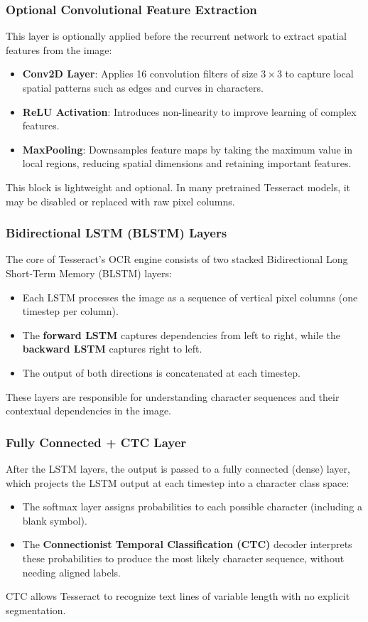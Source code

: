 \subsubsection*{Optional Convolutional Feature Extraction}
This layer is optionally applied before the recurrent network to extract spatial features from the image:
\begin{itemize}
    \item \textbf{Conv2D Layer}: Applies 16 convolution filters of size $3 \times 3$ to capture local spatial patterns such as edges and curves in characters.
    \item \textbf{ReLU Activation}: Introduces non-linearity to improve learning of complex features.
    \item \textbf{MaxPooling}: Downsamples feature maps by taking the maximum value in local regions, reducing spatial dimensions and retaining important features.
\end{itemize}
This block is lightweight and optional. In many pretrained Tesseract models, it may be disabled or replaced with raw pixel columns.

\subsubsection*{Bidirectional LSTM (BLSTM) Layers}
The core of Tesseract’s OCR engine consists of two stacked Bidirectional Long Short-Term Memory (BLSTM) layers:
\begin{itemize}
    \item Each LSTM processes the image as a sequence of vertical pixel columns (one timestep per column).
    \item The \textbf{forward LSTM} captures dependencies from left to right, while the \textbf{backward LSTM} captures right to left.
    \item The output of both directions is concatenated at each timestep.
\end{itemize}
These layers are responsible for understanding character sequences and their contextual dependencies in the image.

\subsubsection*{Fully Connected + CTC Layer}
After the LSTM layers, the output is passed to a fully connected (dense) layer, which projects the LSTM output at each timestep into a character class space:
\begin{itemize}
    \item The softmax layer assigns probabilities to each possible character (including a blank symbol).
    \item The \textbf{Connectionist Temporal Classification (CTC)} decoder interprets these probabilities to produce the most likely character sequence, without needing aligned labels.
\end{itemize}
CTC allows Tesseract to recognize text lines of variable length with no explicit segmentation.

